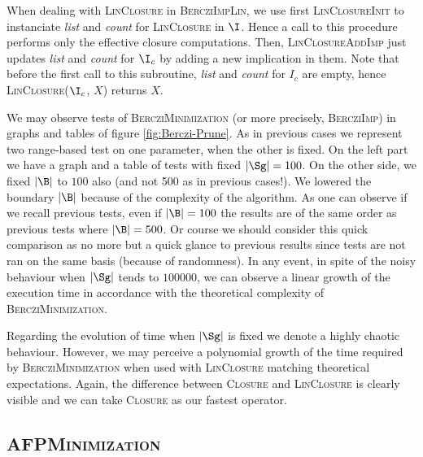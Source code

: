 When dealing with \textsc{LinClosure} in \textsc{BercziImpLin}, we use first \textsc{LinClosureInit} to instanciate 
\textit{list} and \textit{count} for \textsc{LinClosure} in $\I$. Hence a call
to this procedure performs only the effective closure computations. Then, 
\textsc{LinClosureAddImp} just updates \textit{list} and \textit{count} for $\I_c$ by adding a new implication in them. Note that before the first call to
this subroutine, \textit{list} and \textit{count} for $I_c$ are empty, hence
\textsc{LinClosure}($\I_c$, $X$) returns $X$.

\vspace{1.2em}

We may observe tests of \textsc{BercziMinimization} (or more precisely, \textsc{BercziImp}) in graphs and tables of figure \ref{fig:Berczi-Prune}. As in previous cases we represent two range-based test on one parameter, when the other is fixed. On the left part we have a graph and a table of tests with fixed $|\Sg| = 100$. On the other side, we fixed $|\B|$ to $100$ also (and not 500 as in previous cases!). We lowered the boundary $|\B|$ because of the complexity of the algorithm. As one can observe if we recall previous tests, even if $|\B| = 100$ the results are of the same order as previous tests where $|\B| = 500$. Or course we should consider this quick comparison as no more but a quick glance to previous results since tests are not ran on the same basis (because of randomness). In any event, in spite of the noisy behaviour when $|\Sg|$ tends to $100000$, we can observe a linear growth of the execution time in accordance with the theoretical complexity of \textsc{BercziMinimization}.

\begin{figure}[ht!]
	
\end{figure}

\vspace{1.2em}

Regarding the evolution of time when $|\Sg|$ is fixed we denote a highly chaotic
behaviour. However, we may perceive a polynomial growth of the time required by
\textsc{BercziMinimization} when used with \textsc{LinClosure} matching theoretical expectations. Again, the difference between \textsc{Closure} and \textsc{LinClosure} is clearly visible and we can take \textsc{Closure} as our fastest operator.

\subsection{\textsc{AFPMinimization}}

